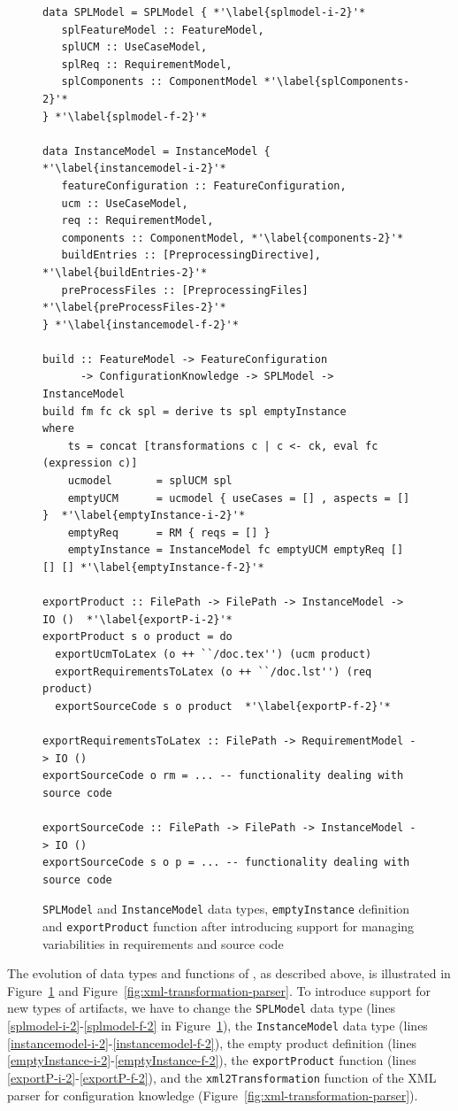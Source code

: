 \begin{figure}[t!]
\begin{lstlisting}
data SPLModel = SPLModel { *'\label{splmodel-i-2}'*
   splFeatureModel :: FeatureModel,
   splUCM :: UseCaseModel,
   splReq :: RequirementModel,
   splComponents :: ComponentModel *'\label{splComponents-2}'*
} *'\label{splmodel-f-2}'*

data InstanceModel = InstanceModel { *'\label{instancemodel-i-2}'*
   featureConfiguration :: FeatureConfiguration,
   ucm :: UseCaseModel,
   req :: RequirementModel,
   components :: ComponentModel, *'\label{components-2}'*
   buildEntries :: [PreprocessingDirective], *'\label{buildEntries-2}'*
   preProcessFiles :: [PreprocessingFiles] *'\label{preProcessFiles-2}'*
} *'\label{instancemodel-f-2}'*

build :: FeatureModel -> FeatureConfiguration 
      -> ConfigurationKnowledge -> SPLModel -> InstanceModel
build fm fc ck spl = derive ts spl emptyInstance
where
    ts = concat [transformations c | c <- ck, eval fc (expression c)]
    ucmodel       = splUCM spl
    emptyUCM      = ucmodel { useCases = [] , aspects = [] }  *'\label{emptyInstance-i-2}'*
    emptyReq      = RM { reqs = [] }
    emptyInstance = InstanceModel fc emptyUCM emptyReq [] [] [] *'\label{emptyInstance-f-2}'*

exportProduct :: FilePath -> FilePath -> InstanceModel -> IO ()  *'\label{exportP-i-2}'*
exportProduct s o product = do
  exportUcmToLatex (o ++ ``/doc.tex'') (ucm product)
  exportRequirementsToLatex (o ++ ``/doc.lst'') (req product)
  exportSourceCode s o product  *'\label{exportP-f-2}'*

exportRequirementsToLatex :: FilePath -> RequirementModel -> IO ()
exportSourceCode o rm = ... -- functionality dealing with source code

exportSourceCode :: FilePath -> FilePath -> InstanceModel -> IO ()
exportSourceCode s o p = ... -- functionality dealing with source code
\end{lstlisting}
\caption{\texttt{SPLModel} and \texttt{InstanceModel} data types,
  \texttt{emptyInstance} definition and \texttt{exportProduct}
  function after introducing support for managing variabilities in
  requirements and source code}
\label{fig:spl-model-with-req-and-code}
\end{figure}


The evolution of data types and functions of \hp{}, as described
above, is illustrated in Figure~\ref{fig:spl-model-with-req-and-code}
and Figure~\ref{fig:xml-transformation-parser}. To introduce support
for new types of artifacts, we have to change the \texttt{SPLModel}
data type (lines \ref{splmodel-i-2}-\ref{splmodel-f-2} in
Figure~\ref{fig:spl-model-with-req-and-code}), the
\texttt{InstanceModel} data type (lines
\ref{instancemodel-i-2}-\ref{instancemodel-f-2}), the empty product
definition (lines \ref{emptyInstance-i-2}-\ref{emptyInstance-f-2}),
the \texttt{exportProduct} function (lines
\ref{exportP-i-2}-\ref{exportP-f-2}), and the
\texttt{xml2Transformation} function of the XML parser for
configuration knowledge (Figure~\ref{fig:xml-transformation-parser}).

